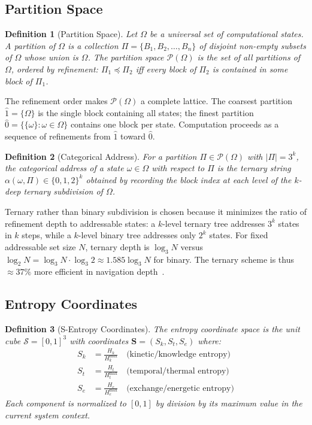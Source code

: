 \documentclass[12pt,twocolumn]{article}
\newtheorem{definition}{Definition}[section]
\begin{document}
\subsection{Partition Space}

\begin{definition}[Partition Space]
Let $\Omega$ be a universal set of computational states. A \emph{partition} of $\Omega$ is a collection $\Pi = \{B_1, B_2, \ldots, B_n\}$ of disjoint non-empty subsets of $\Omega$ whose union is $\Omega$. The \emph{partition space} $\mathcal{P}(\Omega)$ is the set of all partitions of $\Omega$, ordered by refinement: $\Pi_1 \preceq \Pi_2$ iff every block of $\Pi_2$ is contained in some block of $\Pi_1$.
\end{definition}

The refinement order makes $\mathcal{P}(\Omega)$ a complete lattice. The coarsest partition $\hat{1} = \{\Omega\}$ is the single block containing all states; the finest partition $\hat{0} = \{\{\omega\} : \omega \in \Omega\}$ contains one block per state. Computation proceeds as a sequence of refinements from $\hat{1}$ toward $\hat{0}$.

\begin{definition}[Categorical Address]
For a partition $\Pi \in \mathcal{P}(\Omega)$ with $|\Pi| = 3^k$, the \emph{categorical address} of a state $\omega \in \Omega$ with respect to $\Pi$ is the ternary string $\alpha(\omega, \Pi) \in \{0,1,2\}^k$ obtained by recording the block index at each level of the $k$-deep ternary subdivision of $\Omega$.
\end{definition}

Ternary rather than binary subdivision is chosen because it minimizes the ratio of refinement depth to addressable states: a $k$-level ternary tree addresses $3^k$ states in $k$ steps, while a $k$-level binary tree addresses only $2^k$ states. For fixed addressable set size $N$, ternary depth is $\log_3 N$ versus $\log_2 N = \log_3 N \cdot \log_3 2 \approx 1.585 \log_3 N$ for binary. The ternary scheme is thus $\approx 37\%$ more efficient in navigation depth~\cite{cormen2009introduction}.

\subsection{Entropy Coordinates}
\label{sec:entropy_coords}

\begin{definition}[S-Entropy Coordinates]
The \emph{entropy coordinate space} is the unit cube $\mathcal{S} = [0,1]^3$ with coordinates $\mathbf{S} = (S_k, S_t, S_e)$ where:
\begin{align}
S_k &= \frac{H_k}{H_k^{\max}} \quad \text{(kinetic/knowledge entropy)} \\
S_t &= \frac{H_t}{H_t^{\max}} \quad \text{(temporal/thermal entropy)} \\
S_e &= \frac{H_e}{H_e^{\max}} \quad \text{(exchange/energetic entropy)}
\end{align}
Each component is normalized to $[0,1]$ by division by its maximum value in the current system context.
\end{definition}
\end{document}

